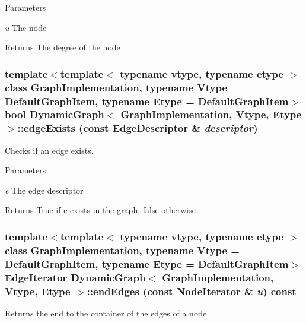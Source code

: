 \begin{DoxyParams}{Parameters}
\item[{\em u}]The node \end{DoxyParams}
\begin{DoxyReturn}{Returns}
The degree of the node 
\end{DoxyReturn}
\hypertarget{class_dynamic_graph_a7dabd7e0a75dfff8aba6a80f522886f4}{
\subsubsection[{edgeExists}]{\setlength{\rightskip}{0pt plus 5cm}template$<$template$<$ typename vtype, typename etype $>$ class GraphImplementation, typename Vtype  = DefaultGraphItem, typename Etype  = DefaultGraphItem$>$ bool {\bf DynamicGraph}$<$ GraphImplementation, Vtype, Etype $>$::edgeExists (const EdgeDescriptor \& {\em descriptor})}}
\label{class_dynamic_graph_a7dabd7e0a75dfff8aba6a80f522886f4}


Checks if an edge exists. 


\begin{DoxyParams}{Parameters}
\item[{\em e}]The edge descriptor \end{DoxyParams}
\begin{DoxyReturn}{Returns}
True if e exists in the graph, false otherwise 
\end{DoxyReturn}
\hypertarget{class_dynamic_graph_a71a4d1b575bcccf1a189bc83ab3d1373}{
\subsubsection[{endEdges}]{\setlength{\rightskip}{0pt plus 5cm}template$<$template$<$ typename vtype, typename etype $>$ class GraphImplementation, typename Vtype  = DefaultGraphItem, typename Etype  = DefaultGraphItem$>$ EdgeIterator {\bf DynamicGraph}$<$ GraphImplementation, Vtype, Etype $>$::endEdges (const NodeIterator \& {\em u}) const}}
\label{class_dynamic_graph_a71a4d1b575bcccf1a189bc83ab3d1373}


Returns the end to the container of the edges of a node. 


